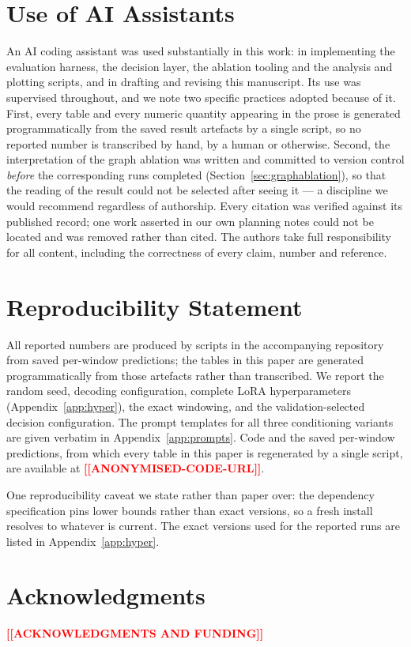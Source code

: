 \documentclass[10pt,twocolumn]{article}
\newcommand{\ph}[1]{\textcolor{red}{\textbf{[[#1]]}}}
\begin{document}
\section*{Use of AI Assistants}
An AI coding assistant was used substantially in this work: in implementing the
evaluation harness, the decision layer, the ablation tooling and the analysis
and plotting scripts, and in drafting and revising this manuscript. Its use was
supervised throughout, and we note two specific practices adopted because of it.
First, every table and every numeric quantity appearing in the prose is
generated programmatically from the saved result artefacts by a single script,
so no reported number is transcribed by hand, by a human or otherwise. Second,
the interpretation of the graph ablation was written and committed to version
control \emph{before} the corresponding runs completed
(Section~\ref{sec:graphablation}), so that the reading of the result could not be
selected after seeing it --- a discipline we would recommend regardless of
authorship. Every citation was verified against its published record; one work
asserted in our own planning notes could not be located and was removed rather
than cited. The authors take full responsibility for all content, including the
correctness of every claim, number and reference.

\section*{Reproducibility Statement}
All reported numbers are produced by scripts in the accompanying repository from
saved per-window predictions; the tables in this paper are generated
programmatically from those artefacts rather than transcribed. We report the
random seed, decoding configuration, complete LoRA hyperparameters
(Appendix~\ref{app:hyper}), the exact windowing, and the validation-selected
decision configuration. The prompt templates for all three conditioning variants
are given verbatim in Appendix~\ref{app:prompts}. Code and the saved per-window
predictions, from which every table in this paper is regenerated by a single
script, are available at \ph{ANONYMISED-CODE-URL}.

One reproducibility caveat we state rather than paper over: the dependency
specification pins lower bounds rather than exact versions, so a fresh install
resolves to whatever is current. The exact versions used for the reported runs
are listed in Appendix~\ref{app:hyper}.

\section*{Acknowledgments}
\ph{ACKNOWLEDGMENTS AND FUNDING}
\end{document}
